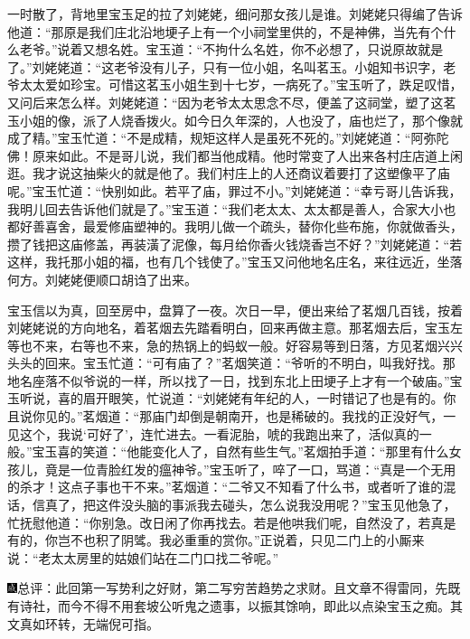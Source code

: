 一时散了，背地里宝玉足的拉了刘姥姥，细问那女孩儿是谁。刘姥姥只得编了告诉他道：``那原是我们庄北沿地埂子上有一个小祠堂里供的，不是神佛，当先有个什么老爷。''说着又想名姓。宝玉道：``不拘什么名姓，你不必想了，只说原故就是了。''刘姥姥道：``这老爷没有儿子，只有一位小姐，名叫茗玉。小姐知书识字，老爷太太爱如珍宝。可惜这茗玉小姐生到十七岁，一病死了。''宝玉听了，跌足叹惜，又问后来怎么样。刘姥姥道：``因为老爷太太思念不尽，便盖了这祠堂，塑了这茗玉小姐的像，派了人烧香拨火。如今日久年深的，人也没了，庙也烂了，那个像就成了精。''宝玉忙道：``不是成精，规矩这样人是虽死不死的。''刘姥姥道：``阿弥陀佛！原来如此。不是哥儿说，我们都当他成精。他时常变了人出来各村庄店道上闲逛。我才说这抽柴火的就是他了。我们村庄上的人还商议着要打了这塑像平了庙呢。''宝玉忙道：``快别如此。若平了庙，罪过不小。''刘姥姥道：``幸亏哥儿告诉我，我明儿回去告诉他们就是了。''宝玉道：``我们老太太、太太都是善人，合家大小也都好善喜舍，最爱修庙塑神的。我明儿做一个疏头，替你化些布施，你就做香头，攒了钱把这庙修盖，再装潢了泥像，每月给你香火钱烧香岂不好？''刘姥姥道：``若这样，我托那小姐的福，也有几个钱使了。''宝玉又问他地名庄名，来往远近，坐落何方。刘姥姥便顺口胡诌了出来。

宝玉信以为真，回至房中，盘算了一夜。次日一早，便出来给了茗烟几百钱，按着刘姥姥说的方向地名，着茗烟去先踏看明白，回来再做主意。那茗烟去后，宝玉左等也不来，右等也不来，急的热锅上的蚂蚁一般。好容易等到日落，方见茗烟兴兴头头的回来。宝玉忙道：``可有庙了？''茗烟笑道：``爷听的不明白，叫我好找。那地名座落不似爷说的一样，所以找了一日，找到东北上田埂子上才有一个破庙。''宝玉听说，喜的眉开眼笑，忙说道：``刘姥姥有年纪的人，一时错记了也是有的。你且说你见的。''茗烟道：``那庙门却倒是朝南开，也是稀破的。我找的正没好气，一见这个，我说`可好了'，连忙进去。一看泥胎，唬的我跑出来了，活似真的一般。''宝玉喜的笑道：``他能变化人了，自然有些生气。''茗烟拍手道：``那里有什么女孩儿，竟是一位青脸红发的瘟神爷。''宝玉听了，啐了一口，骂道：``真是一个无用的杀才！这点子事也干不来。''茗烟道：``二爷又不知看了什么书，或者听了谁的混话，信真了，把这件没头脑的事派我去碰头，怎么说我没用呢？''宝玉见他急了，忙抚慰他道：``你别急。改日闲了你再找去。若是他哄我们呢，自然没了，若真是有的，你岂不也积了阴骘。我必重重的赏你。''正说着，只见二门上的小厮来说：``老太太房里的姑娘们站在二门口找二爷呢。''

{\includegraphics[width=3mm]{../Images/00005}总评：此回第一写势利之好财，第二写穷苦趋势之求财。且文章不得雷同，先既有诗社，而今不得不用套坡公听鬼之遗事，以振其馀响，即此以点染宝玉之痴。其文真如环转，无端倪可指。}
